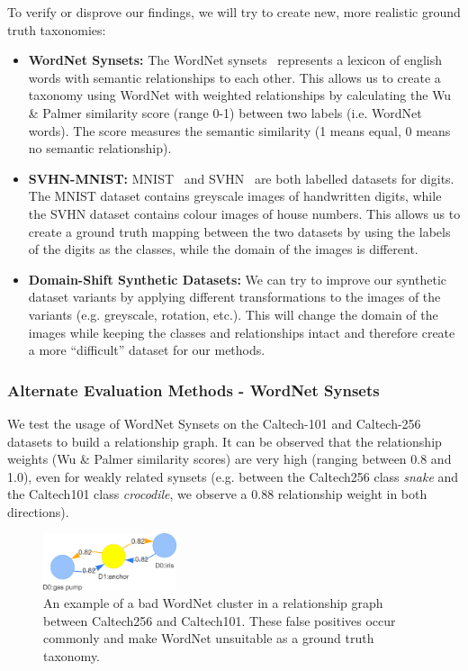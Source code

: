 To verify or disprove our findings, we will try to create new, more realistic ground truth taxonomies:
\begin{itemize}
      \item \textbf{WordNet Synsets:} The WordNet synsets~\cite{fellbaum_wordnet_1998,noauthor_wordnet_nodate}
            represents a lexicon of english words with semantic relationships to each other.
            This allows us to create a taxonomy using WordNet with weighted relationships by calculating
            the Wu \& Palmer similarity score (range 0-1) between two labels (i.e. WordNet words).
            The score measures the semantic similarity (1 means equal, 0 means no semantic relationship).
      \item \textbf{SVHN-MNIST:} MNIST~\cite{deng_mnist_2012} and SVHN~\cite{netzer_reading_2011} are both labelled datasets
            for digits. The MNIST dataset contains greyscale images of handwritten digits,
            while the SVHN dataset contains colour images of house numbers.
            This allows us to create a ground truth mapping between the two datasets
            by using the labels of the digits as the classes, while the domain of the images
            is different.
      \item \textbf{Domain-Shift Synthetic Datasets:} We can try to improve our synthetic dataset variants
            by applying different transformations to the images of the variants (e.g. greyscale, rotation, etc.).
            This will change the domain of the images while keeping the classes and relationships intact
            and therefore create a more \enquote{difficult} dataset for our methods.
\end{itemize}

\subsubsection{Alternate Evaluation Methods - WordNet Synsets}

We test the usage of WordNet Synsets on the Caltech-101 and Caltech-256 datasets to build a relationship graph.
It can be observed that the relationship weights (Wu \& Palmer similarity scores) are very high (ranging between 0.8 and 1.0),
even for weakly related synsets (e.g. between the Caltech256 class \textit{snake} and the Caltech101 class \textit{crocodile},
we observe a 0.88 relationship weight in both directions).

\begin{figure}[ht]
      \centering
      \includegraphics[width=0.35\textwidth]{figures/wordnet.png}

      \caption{An example of a bad WordNet cluster in a relationship graph between Caltech256 and Caltech101.
            These false positives occur commonly and make WordNet unsuitable as a ground truth taxonomy.}
      \label{fig:wordnet}
\end{figure}

